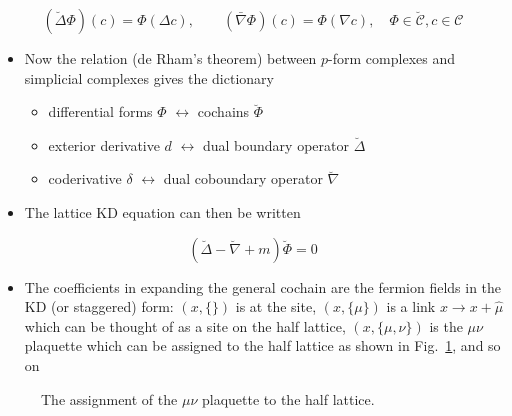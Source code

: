 \begin{equation}
(\breve{\Delta} \Phi)(c)=\Phi(\Delta c), \qquad(\bar{\nabla} \Phi)(c)=\Phi(\nabla c), \quad \Phi \in \breve{\mathcal{C}}, c \in \mathcal{C}
\end{equation}

\begin{itemize}
    \item Now the relation (de Rham's theorem) between $p$-form complexes and simplicial complexes gives the dictionary
    \begin{itemize}
        \item differential forms $\Phi$ $\leftrightarrow$ cochains $\breve{\Phi}$
        \item exterior derivative $d$ $\leftrightarrow$ dual boundary operator $\breve{\Delta}$
        \item coderivative $\delta$ $\leftrightarrow$ dual coboundary operator $\breve{\nabla}$
    \end{itemize}
    \item The lattice KD equation can then be written
\end{itemize}
\begin{equation}
    (\breve{\Delta} - \breve{\nabla} + m )\breve{\Phi} = 0
\end{equation}
\begin{itemize}
    \item The coefficients in expanding the general cochain are the fermion fields in the KD (or staggered) form: $(x, \{\})$ is at the site, $(x, \{\mu\})$ is a link $x \rightarrow x + \hat{\mu}$ which can be thought of as a site on the half lattice, $(x,\{\mu, \nu\})$ is the $\mu \nu$ plaquette which can be assigned to the half lattice as shown in Fig.~\ref{fig:plaq_half_lat}, and so on
\end{itemize}
\begin{figure}
    \centering
    \caption{The assignment of the $\mu \nu$ plaquette to the half lattice.
    \label{fig:plaq_half_lat}}
\end{figure}

